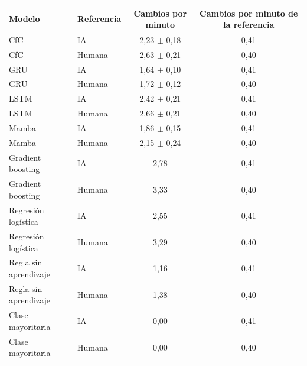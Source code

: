 \begin{tabular}{|l|l|c|c|}
\hline
\textbf{Modelo} & \textbf{Referencia} & \textbf{Cambios por minuto} & \textbf{Cambios por minuto de la referencia} \\ \hline
CfC & IA & 2{,}23 $\pm$ 0{,}18 & 0{,}41 \\ \hline
CfC & Humana & 2{,}63 $\pm$ 0{,}21 & 0{,}40 \\ \hline
GRU & IA & 1{,}64 $\pm$ 0{,}10 & 0{,}41 \\ \hline
GRU & Humana & 1{,}72 $\pm$ 0{,}12 & 0{,}40 \\ \hline
LSTM & IA & 2{,}42 $\pm$ 0{,}21 & 0{,}41 \\ \hline
LSTM & Humana & 2{,}66 $\pm$ 0{,}21 & 0{,}40 \\ \hline
Mamba & IA & 1{,}86 $\pm$ 0{,}15 & 0{,}41 \\ \hline
Mamba & Humana & 2{,}15 $\pm$ 0{,}24 & 0{,}40 \\ \hline
Gradient boosting & IA & 2{,}78 & 0{,}41 \\ \hline
Gradient boosting & Humana & 3{,}33 & 0{,}40 \\ \hline
Regresión logística & IA & 2{,}55 & 0{,}41 \\ \hline
Regresión logística & Humana & 3{,}29 & 0{,}40 \\ \hline
Regla sin aprendizaje & IA & 1{,}16 & 0{,}41 \\ \hline
Regla sin aprendizaje & Humana & 1{,}38 & 0{,}40 \\ \hline
Clase mayoritaria & IA & 0{,}00 & 0{,}41 \\ \hline
Clase mayoritaria & Humana & 0{,}00 & 0{,}40 \\ \hline
\end{tabular}
